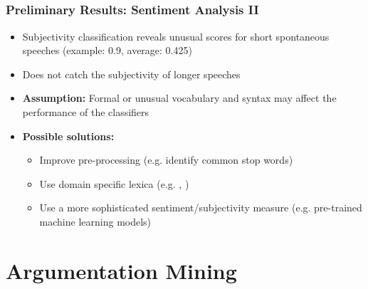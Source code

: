 \documentclass{beamer}
\begin{document}
\subsection{}
\begin{framefont}{\footnotesize}
	\begin{frame}
		\frametitle{Preliminary Results: Sentiment Analysis II}
		\begin{itemize}
			\setlength\itemsep{1.2em}
			\item Subjectivity classification reveals unusual scores for short spontaneous speeches (example: 0.9, average: 0.425)
			\item Does not catch the subjectivity of longer speeches
			\item \textbf{Assumption:} Formal or unusual vocabulary and syntax may affect the performance of the classifiers
			\item \textbf{Possible solutions:}
			\begin{itemize}
			    \item Improve pre-processing (e.g. identify common stop words)
			    \item  Use domain specific lexica (e.g. , )
			    \item  Use a more sophisticated sentiment/subjectivity measure (e.g. pre-trained machine learning models)
			\end{itemize}
		\end{itemize}
	\end{frame}
\end{framefont}

\section{Argumentation Mining}
\end{document}
